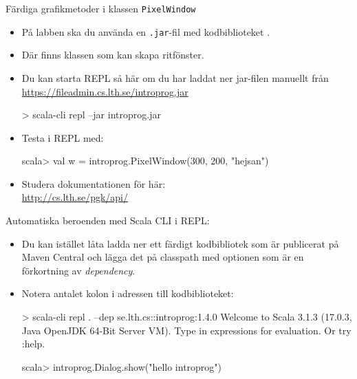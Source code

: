 \begin{Slide}{Färdiga grafikmetoder i klassen \texttt{PixelWindow}}\SlideFontSmall

\begin{itemize}
\item På labben ska du använda en \texttt{.jar}-fil med kodbiblioteket .
\item Där finns klassen  som kan skapa ritfönster.
\item Du kan starta REPL så här om du har laddat ner jar-filen manuellt från\\\url{https://fileadmin.cs.lth.se/introprog.jar}  %
\begin{REPLnonum}
> scala-cli repl --jar introprog.jar 
\end{REPLnonum}
\item Testa  i REPL med:
\begin{REPLnonum}
scala> val w = introprog.PixelWindow(300, 200, "hejsan")
\end{REPLnonum}
\item Studera dokumentationen för  här: \\\url{http://cs.lth.se/pgk/api/}
\end{itemize}
\end{Slide}


\begin{Slide}{Automatiska beroenden med Scala CLI i REPL:}
\begin{itemize}\SlideFontSmall
\item Du kan istället låta   ladda ner ett färdigt kodbibliotek som är publicerat på Maven Central och lägga det på classpath med optionen  som är en förkortning av \emph{dependency}. 
\item Notera antalet kolon i adressen till kodbiblioteket:
\begin{REPLsmall}
> scala-cli repl . --dep se.lth.cs::introprog:1.4.0
Welcome to Scala 3.1.3 (17.0.3, Java OpenJDK 64-Bit Server VM).
Type in expressions for evaluation. Or try :help.

scala> introprog.Dialog.show("hello introprog")
\end{REPLsmall}
\end{itemize}
\end{Slide}


